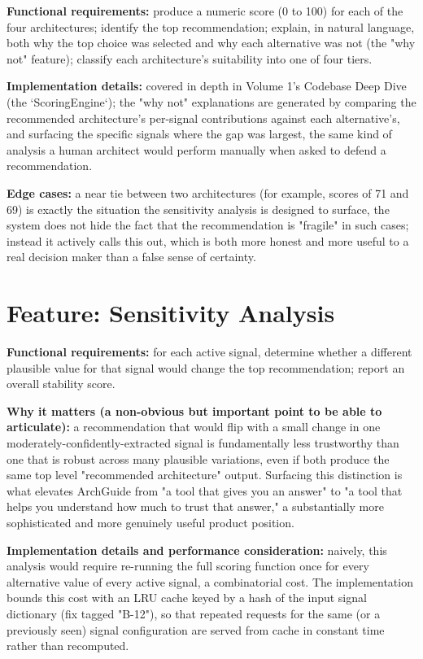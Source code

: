 \documentclass[11pt,a4paper]{report}
\begin{document}
\textbf{Functional requirements:} produce a numeric score (0 to 100) for each of the four architectures; identify the top recommendation; explain, in natural language, both why the top choice was selected and why each alternative was not (the "why not" feature); classify each architecture's suitability into one of four tiers.

\textbf{Implementation details:} covered in depth in Volume 1's Codebase Deep Dive (the `ScoringEngine`); the "why not" explanations are generated by comparing the recommended architecture's per-signal contributions against each alternative's, and surfacing the specific signals where the gap was largest, the same kind of analysis a human architect would perform manually when asked to defend a recommendation.

\textbf{Edge cases:} a near tie between two architectures (for example, scores of 71 and 69) is exactly the situation the sensitivity analysis is designed to surface, the system does not hide the fact that the recommendation is "fragile" in such cases; instead it actively calls this out, which is both more honest and more useful to a real decision maker than a false sense of certainty.

\section{Feature: Sensitivity Analysis}

\textbf{Functional requirements:} for each active signal, determine whether a different plausible value for that signal would change the top recommendation; report an overall stability score.

\textbf{Why it matters (a non-obvious but important point to be able to articulate):} a recommendation that would flip with a small change in one moderately-confidently-extracted signal is fundamentally less trustworthy than one that is robust across many plausible variations, even if both produce the same top level "recommended architecture" output. Surfacing this distinction is what elevates ArchGuide from "a tool that gives you an answer" to "a tool that helps you understand how much to trust that answer," a substantially more sophisticated and more genuinely useful product position.

\textbf{Implementation details and performance consideration:} naively, this analysis would require re-running the full scoring function once for every alternative value of every active signal, a combinatorial cost. The implementation bounds this cost with an LRU cache keyed by a hash of the input signal dictionary (fix tagged "B-12"), so that repeated requests for the same (or a previously seen) signal configuration are served from cache in constant time rather than recomputed.
\end{document}
